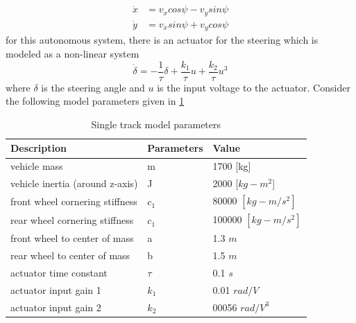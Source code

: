 \begin{align}
	\dot{x} &= v_x cos\psi - v_y sin \psi \\
	\dot{y} &= v_x sin \psi + v_y cos \psi
\end{align}
for this autonomous system, there is an actuator for the steering which is modeled as a non-linear system
\begin{equation}\label{Eq_2_ch_27_Model_2_2}
	\dot{\delta} = -\frac{1}{\tau} \delta + \frac{k_1}{\tau} u + \frac{k_2}{\tau}u^{3}
\end{equation}
where $\delta$ is the steering angle and $u$ is the input voltage to the actuator. Consider the following model parameters given in \ref{Tab_2_ch_27_Model2}
\begin{table}[h!]
	\centering
	\begin{tabular}{p{7cm} p{4cm} p{4cm}}
		\textbf{Description} & \textbf{Parameters} & \textbf{Value}\\
		\toprule[1.5pt]
		vehicle mass & m & 1700 [kg] \\ \cmidrule{1-3}
		vehicle inertia (around z-axis) & J & 2000 [$kg-m^2$] \\ \cmidrule{1-3}
		front wheel cornering stiffness & $c_1$ & 80000 $[kg-m/s^2]$ \\ \cmidrule{1-3}
		rear wheel cornering stiffness & $c_1$ & 100000 $[kg-m/s^2]$ \\ \cmidrule{1-3}
		front wheel to center of mass & a & 1.3 $m$ \\ \cmidrule{1-3}
		rear wheel to center of mass & b & 1.5 $m$ \\ \cmidrule{1-3}
		actuator time constant & $\tau$ & 0.1 $s$ \\ \cmidrule{1-3}
		actuator input gain 1 & $k_1$ & 0.01 $rad/V$ \\ \cmidrule{1-3}
		actuator input gain 2 & $k_2$ & 00056 $rad/V^3$ \\ \bottomrule
	\end{tabular}
	\caption{Single track model parameters}
	\label{Tab_2_ch_27_Model2}
\end{table}

